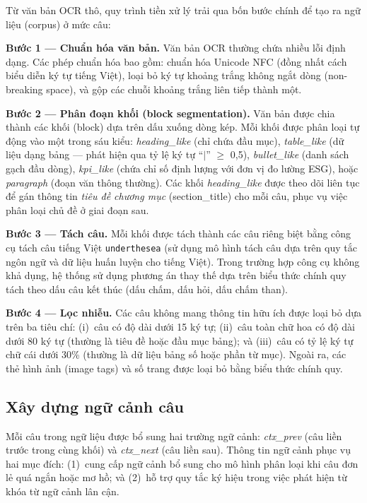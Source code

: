 Từ văn bản OCR thô, quy trình tiền xử lý trải qua bốn bước chính để tạo ra ngữ liệu (corpus) ở mức câu:

\textbf{Bước 1 --- Chuẩn hóa văn bản.} Văn bản OCR thường chứa nhiều lỗi định dạng. Các phép chuẩn hóa bao gồm: chuẩn hóa Unicode NFC (đồng nhất cách biểu diễn ký tự tiếng Việt), loại bỏ ký tự khoảng trắng không ngắt dòng (non-breaking space), và gộp các chuỗi khoảng trắng liên tiếp thành một.

\textbf{Bước 2 --- Phân đoạn khối (block segmentation).} Văn bản được chia thành các khối (block) dựa trên dấu xuống dòng kép. Mỗi khối được phân loại tự động vào một trong sáu kiểu: \textit{heading\_like} (chỉ chứa đầu mục), \textit{table\_like} (dữ liệu dạng bảng --- phát hiện qua tỷ lệ ký tự ``$|$'' $\geq$ 0{,}5), \textit{bullet\_like} (danh sách gạch đầu dòng), \textit{kpi\_like} (chứa chỉ số định lượng với đơn vị đo lường ESG), hoặc \textit{paragraph} (đoạn văn thông thường). Các khối \textit{heading\_like} được theo dõi liên tục để gán thông tin \textit{tiêu đề chương mục} (section\_title) cho mỗi câu, phục vụ việc phân loại chủ đề ở giai đoạn sau.

\textbf{Bước 3 --- Tách câu.} Mỗi khối được tách thành các câu riêng biệt bằng công cụ tách câu tiếng Việt \texttt{underthesea} (sử dụng mô hình tách câu dựa trên quy tắc ngôn ngữ và dữ liệu huấn luyện cho tiếng Việt). Trong trường hợp công cụ không khả dụng, hệ thống sử dụng phương án thay thế dựa trên biểu thức chính quy tách theo dấu câu kết thúc (dấu chấm, dấu hỏi, dấu chấm than).

\textbf{Bước 4 --- Lọc nhiễu.} Các câu không mang thông tin hữu ích được loại bỏ dựa trên ba tiêu chí: (i)~câu có độ dài dưới 15 ký tự; (ii)~câu toàn chữ hoa có độ dài dưới 80 ký tự (thường là tiêu đề hoặc đầu mục bảng); và (iii)~câu có tỷ lệ ký tự chữ cái dưới 30\% (thường là dữ liệu bảng số hoặc phần từ mục). Ngoài ra, các thẻ hình ảnh (image tags) và số trang được loại bỏ bằng biểu thức chính quy.

\subsection{Xây dựng ngữ cảnh câu}
\label{subsec:context_window}

Mỗi câu trong ngữ liệu được bổ sung hai trường ngữ cảnh: \textit{ctx\_prev} (câu liền trước trong cùng khối) và \textit{ctx\_next} (câu liền sau). Thông tin ngữ cảnh phục vụ hai mục đích: (1)~cung cấp ngữ cảnh bổ sung cho mô hình phân loại khi câu đơn lẻ quá ngắn hoặc mơ hồ; và (2)~hỗ trợ quy tắc ký hiệu trong việc phát hiện từ khóa từ ngữ cảnh lân cận.

